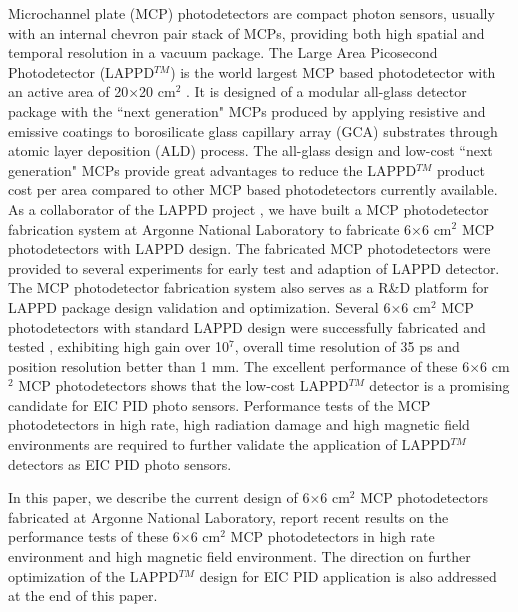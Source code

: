 \documentclass[preprint,5p]{elsarticle}
\begin{document}
Microchannel plate (MCP) photodetectors are compact photon sensors, usually 
with an internal chevron pair stack of MCPs, providing both high spatial and 
temporal resolution in a vacuum package. The Large Area Picosecond 
Photodetector (LAPPD$^{TM}$) is the world largest MCP based photodetector with 
an active area of 20$\times$20 cm$^2$ \cite{LAPPD}. It is designed of a modular 
all-glass detector package with the ``next generation" MCPs produced by 
applying resistive and emissive coatings to borosilicate glass capillary array 
(GCA) substrates through atomic layer deposition (ALD) process. The all-glass 
design and low-cost ``next generation" MCPs provide great advantages to reduce 
the LAPPD$^{TM}$ product cost per area compared to other MCP based 
photodetectors currently available. As a collaborator of the LAPPD project 
\cite{LAPPD2}, we have built a MCP photodetector fabrication system 
\cite{LAPPD-ANL} at Argonne National Laboratory to fabricate 6$\times$6 cm$^2$ 
MCP photodetectors with LAPPD design.  The fabricated MCP photodetectors were 
provided to several experiments for early test and adaption of LAPPD detector.  
The MCP photodetector fabrication system also serves as a R{\&}D platform for 
LAPPD package design validation and optimization. Several 6$\times$6 cm$^2$ MCP 
photodetectors with standard LAPPD design were successfully fabricated and 
tested \cite{ANL-MCPs,Wang-MCPs,Wang-MCPs2}, exhibiting high gain over 10$^7$, 
overall time resolution of 35 ps and position resolution better than 1 mm.  The 
excellent performance of these 6$\times$6 cm$^2$ MCP photodetectors shows that 
the low-cost LAPPD$^{TM}$ detector is a promising candidate for EIC PID photo 
sensors.  Performance tests of the MCP photodetectors in high rate, high 
radiation damage and high magnetic field environments are required to further 
validate the application of LAPPD$^{TM}$ detectors as EIC PID photo sensors. 

In this paper, we describe the current design of 6$\times$6 cm$^2$ MCP 
photodetectors fabricated at Argonne National Laboratory, report recent results 
on the performance tests of these 6$\times$6 cm$^2$ MCP photodetectors in high 
rate environment and high magnetic field environment. The direction on further 
optimization of the LAPPD$^{TM}$ design for EIC PID application is also 
addressed at the end of this paper.
\end{document}
